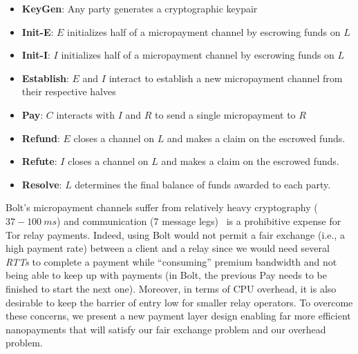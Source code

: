 \begin{itemize}
\item \textbf{KeyGen}: Any party generates a cryptographic keypair
\item \textbf{Init-E}: $E$ initializes half of a micropayment channel by
  escrowing funds on $L$
\item \textbf{Init-I}: $I$ initializes half of a micropayment channel by
  escrowing funds on $L$
\item \textbf{Establish}: $E$ and $I$ interact to establish a new micropayment
  channel from their respective halves
\item \textbf{Pay}: $C$ interacts with $I$ and $R$ to send a single micropayment to $R$
\item \textbf{Refund}: $E$ closes a channel on $L$ and makes a claim on
  the escrowed funds.
\item \textbf{Refute}: $I$ closes a channel on $L$ and makes a claim on
  the escrowed funds.
\item \textbf{Resolve}: $L$ determines the final balance of funds awarded to
  each party.
\end{itemize}

Bolt's micropayment channels suffer from relatively heavy cryptography ($37-100\ ms$) and communication
(7 message legs)~\cite{green2017bolt} is a prohibitive expense for Tor relay payments. Indeed, using Bolt would not permit a fair exchange (i.e., a high payment rate) between a client and a relay since we would need several \textit{RTTs} to complete a payment while ``consuming'' premium bandwidth and not being able to keep up with payments (in Bolt, the previous Pay needs to be finished to start the next one). Moreover, in terms of CPU overhead, it is also desirable to keep the
barrier of entry low for smaller relay operators. To overcome these
concerns, we present a new payment layer design enabling far more efficient
nanopayments that will satisfy our fair exchange problem and our overhead problem.

